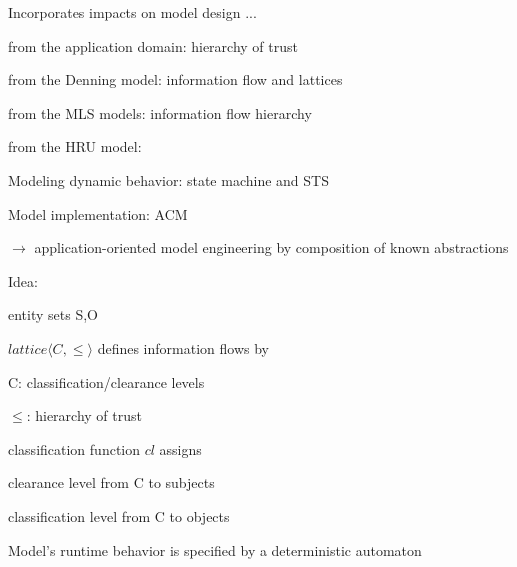 \documentclass[a4paper]{article}
\begin{document}
\begin{multicols}{3}
    Incorporates impacts on model design ...
    \begin{itemize*}
        \item from the application domain: hierarchy of trust
        \item from the Denning model: information flow and lattices
        \item from the MLS models: information flow hierarchy
        \item from the HRU model:
              \begin{itemize*}
                  \item Modeling dynamic behavior: state machine and STS
                  \item Model implementation: ACM
              \end{itemize*}
        \item $\rightarrow$ application-oriented model engineering by composition of known abstractions
    \end{itemize*}

    Idea:
    \begin{itemize*}
        \item entity sets S,O
        \item $lattice⟨C,\leq⟩$ defines information flows by
              \begin{itemize*}
                  \item C: classification/clearance levels
                  \item $\leq$: hierarchy of trust
              \end{itemize*}
        \item classification function $cl$ assigns
              \begin{itemize*}
                  \item clearance level from C to subjects
                  \item classification level from C to objects
              \end{itemize*}
        \item Model’s runtime behavior is specified by a deterministic automaton
    \end{itemize*}


\end{multicols}
\end{document}
